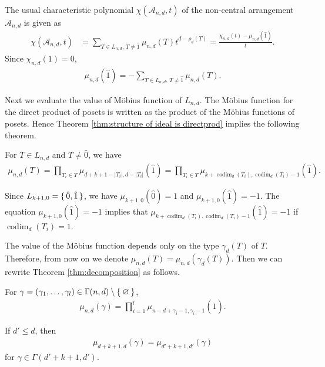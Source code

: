 \documentclass{wstmp}
\begin{document}
The usual characteristic polynomial $\chi({\mathcal{A}}_{n,d},t)$
of the non-central arrangement ${\mathcal{A}}_{n,d}$ 
is given as
\begin{align*}
\chi({\mathcal{A}}_{n,d},t)
&=\sum_{T\in L_{n,d}, \, T\neq {\hat{1}}} \mu_{n,d}(T) t^{d-\rho_d(T)}
=\frac{\chi_{n,d}(t)- \mu_{n,d}({\hat{1}})}{t}.
\end{align*}
Since  $\chi_{n,d}(1)=0$, 
\begin{align}
\label{eq:mumaxphi}
  \mu_{n,d}({\hat{1}})
=- \sum_{T\in L_{n,d}, \, T\neq {\hat{1}}} \mu_{n,d}(T).
\end{align}

Next we evaluate the value of M\"obius function of $L_{n,d}$.
The M\"obius function for the direct product of posets
is written as the product of the M\"obius functions of posets.
Hence 
Theorem \ref{thm:structure of ideal is directprod} implies
the following theorem.

\begin{theorem}
\label{thm:decomposition}
For $T\in L_{n,d}$ and $T\neq {\hat{0}}$, we have
\begin{align*}
\mu_{n,d}(T)=
\prod_{T_i \in T}
\mu_{d+k+1-{\left|{T_i}\right|},d-{\left|{T_i}\right|}}({\hat{1}})=
\prod_{T_i \in T}
\mu_{k+{\operatorname{codim}}_{d}(T_i),{\operatorname{codim}}_{d}(T_i)-1}({\hat{1}}).
\end{align*}
\end{theorem}
\begin{remark} 
Since $L_{k+1,0}=\set{{\hat{0}},{\hat{1}}}$,
we have  $\mu_{k+1,0}({\hat{0}})=1$ and $\mu_{k+1,0}({\hat{1}})=-1$.
The equation $\mu_{k+1,0}({\hat{1}})=-1$
implies that
$\mu_{k+{\operatorname{codim}}_{d}(T_i),{\operatorname{codim}}_{d}(T_i)-1}({\hat{1}})=-1$
if ${\operatorname{codim}}_{d}(T_i)=1$.
\end{remark}

The value of the M\"obius function 
depends only on 
the type  $\gamma_d(T)$ of $T$.
Therefore, from now on 
we denote $\mu_{n,d}(T)=\mu_{n,d}(\gamma_d(T))$.
Then we can rewrite Theorem \ref{thm:decomposition} as
follows.
\begin{corollary}
\label{cor:mobius:decomp}
For $\gamma=(\gamma_1,\ldots,\gamma_l)\in \Gamma(n,d) \setminus\Set{\varnothing}$,
\begin{align*}
\mu_{n,d}(\gamma)=
\prod_{i=1}^{l}\mu_{n-d+\gamma_i-1,\gamma_i-1}({\hat{1}}).
\end{align*}
\end{corollary}

\begin{corollary}
\label{cor:type}
If $d'\leq d$, then
\begin{align*}
\mu_{d+k+1,d}(\gamma)
=
\mu_{d'+k+1,d'}(\gamma)
\end{align*}
for $\gamma\in \Gamma(d'+k+1,d')$.
\end{corollary}
\end{document}
